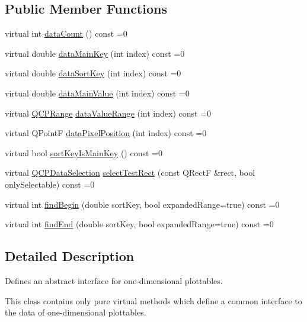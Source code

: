 \subsection*{Public Member Functions}
\begin{DoxyCompactItemize}
\item 
virtual int \hyperlink{classQCPPlottableInterface1D_a058a22c770ef4d5a0e878a7f02183da9}{data\+Count} () const =0
\item 
virtual double \hyperlink{classQCPPlottableInterface1D_a2bd60daaac046945fead558cbd83cf73}{data\+Main\+Key} (int index) const =0
\item 
virtual double \hyperlink{classQCPPlottableInterface1D_afdc92f9f01e7e35f2e96b2ea9dc14ae7}{data\+Sort\+Key} (int index) const =0
\item 
virtual double \hyperlink{classQCPPlottableInterface1D_af6330919e8023277d08c958a6074fc76}{data\+Main\+Value} (int index) const =0
\item 
virtual \hyperlink{classQCPRange}{Q\+C\+P\+Range} \hyperlink{classQCPPlottableInterface1D_a9ca7fcf14d885a200879768679b19be9}{data\+Value\+Range} (int index) const =0
\item 
virtual Q\+PointF \hyperlink{classQCPPlottableInterface1D_a78911838cfbcfd2d8df9ad2fdbfb8e93}{data\+Pixel\+Position} (int index) const =0
\item 
virtual bool \hyperlink{classQCPPlottableInterface1D_a229e65e7ab968dd6cd0e259fa504b79d}{sort\+Key\+Is\+Main\+Key} () const =0
\item 
virtual \hyperlink{classQCPDataSelection}{Q\+C\+P\+Data\+Selection} \hyperlink{classQCPPlottableInterface1D_a67093e4ccf490ff5f7750640941ff34c}{select\+Test\+Rect} (const Q\+RectF \&rect, bool only\+Selectable) const =0
\item 
virtual int \hyperlink{classQCPPlottableInterface1D_a5b95783271306a4de97be54eac1e7d13}{find\+Begin} (double sort\+Key, bool expanded\+Range=true) const =0
\item 
virtual int \hyperlink{classQCPPlottableInterface1D_a5deced1016bc55a41a2339619045b295}{find\+End} (double sort\+Key, bool expanded\+Range=true) const =0
\end{DoxyCompactItemize}


\subsection{Detailed Description}
Defines an abstract interface for one-\/dimensional plottables. 

This class contains only pure virtual methods which define a common interface to the data of one-\/dimensional plottables.

